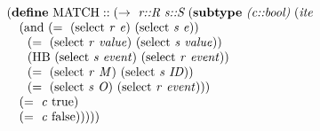 \begin{equation}
\begin{array}{l}
(\cfgt{define}\ \mathrm{MATCH}::(\rightarrow\ \cfgnt{r::R}\ \cfgnt{s::S}\ (\cfgt{subtype}\ \cfgnt{(c::bool)}\ (\cfgnt{ite} \\
\ \ \ (\mathrm{and}\ (=\ (\mathrm{select}\ \mathit{r}\ \mathit{e})\ (\mathrm{select}\ \mathit{s}\ \mathit{e})) \\
\ \ \ \ \     (=\ (\mathrm{select}\ \mathit{r}\ \mathit{value})\ (\mathrm{select}\ \mathit{s}\ \mathit{value})) \\
\ \ \ \ \    (\mathrm{HB}\ (\mathrm{select}\ \mathit{s}\ \mathit{event})\ (\mathrm{select}\ \mathit{r}\ \mathit{event})) \\
\ \ \ \ \    (=\ (\mathrm{select}\ \mathit{r}\ \mathit{M})\ (\mathrm{select}\ \mathit{s}\ \mathit{ID})) \\
\ \ \ \ \    (=\ (\mathrm{select}\ \mathit{s}\ \mathit{O})\ (\mathrm{select}\ \mathit{r}\ \mathit{event}))) \\
\ \ \  (=\ \mathit{c}\ \mathrm{true}) \\
\ \ \  (=\ \mathit{c}\ \mathrm{false})))))
\end{array}
\label{equation:match}
\end{equation}

